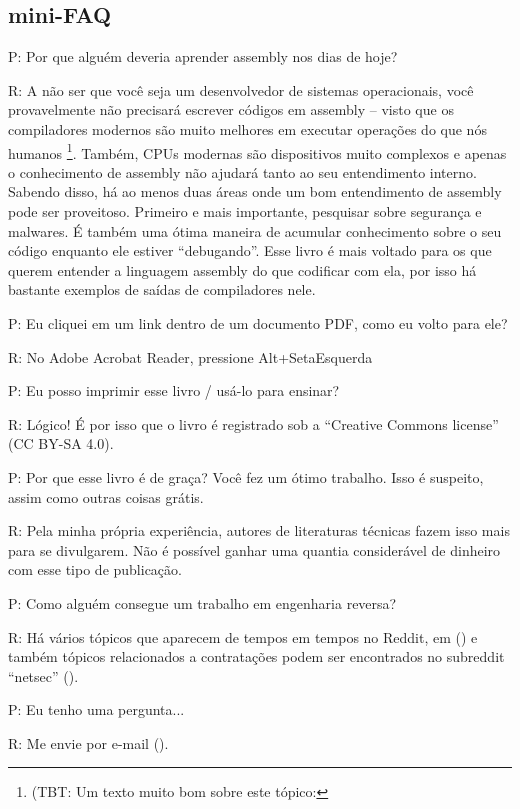 \subsection*{mini-FAQ}

\par P: Por que alguém deveria aprender assembly nos dias de hoje?
\par R: A não ser que você seja um desenvolvedor de sistemas operacionais, você provavelmente não precisará escrever códigos em assembly – visto que os compiladores modernos são muito melhores em executar operações 
do que nós humanos
\footnote{(\ac{TBT}: Um texto muito bom sobre este tópico: \InSqBrackets{\AgnerFog}}.
Também, \ac{CPU}s modernas são dispositivos muito complexos e apenas o conhecimento de assembly não ajudará tanto ao seu entendimento interno. Sabendo disso, há ao menos duas áreas onde um bom entendimento de assembly pode ser proveitoso. Primeiro e mais importante, pesquisar sobre segurança e malwares. É também uma ótima maneira de acumular conhecimento sobre o seu código enquanto ele estiver “debugando”. Esse livro é mais voltado para os que querem entender a linguagem assembly do que codificar com ela, por isso há bastante exemplos de saídas de compiladores nele.

\par P: Eu cliquei em um link dentro de um documento PDF, como eu volto para ele?
\par R: No Adobe Acrobat Reader, pressione Alt+SetaEsquerda

\par P: Eu posso imprimir esse livro / usá-lo para ensinar?
\par R: Lógico! É por isso que o livro é registrado sob a “Creative Commons license” (CC BY-SA 4.0).

\par P: Por que esse livro é de graça? Você fez um ótimo trabalho. Isso é suspeito, assim como outras coisas grátis.
\par R: Pela minha própria experiência, autores de literaturas técnicas fazem isso mais para se divulgarem. Não é possível ganhar uma quantia considerável de dinheiro com esse tipo de publicação.

\par P: Como alguém consegue um trabalho em engenharia reversa?
\par R: Há vários tópicos que aparecem de tempos em tempos no Reddit\FNURLREDDIT{}, em (\RedditHiringThread{})
e também tópicos relacionados a contratações podem ser encontrados no subreddit ``netsec'' (\NetsecHiringThread{}).


\par P: Eu tenho uma pergunta...
\par R: Me envie por e-mail (\EMAIL).

